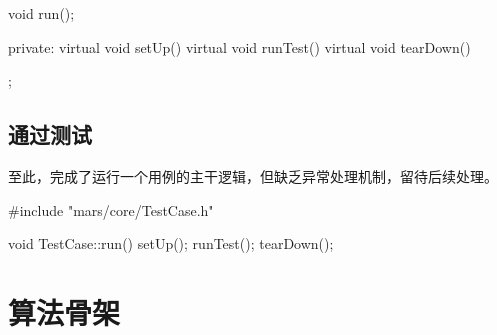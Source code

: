 \begin{content}
\begin{leftbar}
\begin{c++}[caption={\ttfamily{include/mars/core/TestCase.h}}]
{  void run();

private:
  virtual void setUp() {}
  virtual void runTest() {}
  virtual void tearDown() {}
};
  \end{c++}
\end{leftbar}

\subsection{通过测试}

至此，完成了运行一个用例的主干逻辑，但缺乏异常处理机制，留待后续处理。

\begin{leftbar}
 \begin{c++}[caption={\ttfamily{src/mars/core/TestCase.cc}}]
#include "mars/core/TestCase.h"

void TestCase::run() {
  setUp();
  runTest();
  tearDown();
}
 \end{c++}
\end{leftbar}

\end{content}

\section{算法骨架}

